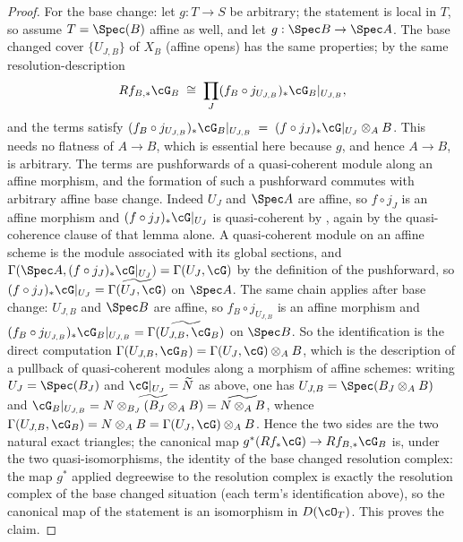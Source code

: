 \begin{proof}
For the base change: let $g:T\to S$ be arbitrary; the statement is
local in $T$, so assume $T=\Spec(B)$ affine as well, and let
$g:\Spec B\to\Spec A$.  The base changed cover
$\{U_{J,B}\}$ of $X_B$ (affine opens) has the same properties; by the
same resolution-description
\[
Rf_{B,*}\cG_B\;\cong\;\prod_{J}(f_B\circ j_{U_{J,B}})_*\cG_B|_{U_{J,B}},
\]
and the terms satisfy
$(f_B\circ j_{U_{J,B}})_*\cG_B|_{U_{J,B}}
\;=\;(f\circ j_J)_*\cG|_{U_J}\otimes_AB$.
This needs no flatness of $A\to B$, which is essential here because
$g$, and hence $A\to B$, is arbitrary.  The terms are pushforwards of a
quasi-coherent module along an affine morphism, and the formation of
such a pushforward commutes with arbitrary affine base change.  Indeed
$U_J$ and $\Spec A$ are affine, so $f\circ j_J$ is an affine morphism
and $(f\circ j_J)_*\cG|_{U_J}$ is quasi-coherent by
, again by the quasi-coherence clause
of that lemma alone.  A quasi-coherent module on an affine scheme is
the module associated with its global sections, and
$\Gamma(\Spec A,(f\circ j_J)_*\cG|_{U_J})=\Gamma(U_J,\cG)$ by the
definition of the pushforward, so
$(f\circ j_J)_*\cG|_{U_J}=\widetilde{\Gamma(U_J,\cG)}$ on $\Spec A$.
The same chain applies after base change: $U_{J,B}$ and $\Spec B$
are affine, so $f_B\circ j_{U_{J,B}}$ is an affine morphism and
$(f_B\circ j_{U_{J,B}})_*\cG_B|_{U_{J,B}}
=\widetilde{\Gamma(U_{J,B},\cG_B)}$ on $\Spec B$.  So the identification
is the direct computation
$\Gamma(U_{J,B},\cG_B)=\Gamma(U_J,\cG)\otimes_AB$, which is the
description of a pullback of quasi-coherent modules along a morphism of
affine schemes: writing $U_J=\Spec(B_J)$ and $\cG|_{U_J}=\widetilde N$
as above, one has $U_{J,B}=\Spec(B_J\otimes_AB)$ and
$\cG_B|_{U_{J,B}}=\widetilde{N\otimes_{B_J}(B_J\otimes_AB)}
=\widetilde{N\otimes_AB}$, whence
$\Gamma(U_{J,B},\cG_B)=N\otimes_AB=\Gamma(U_J,\cG)\otimes_AB$.
Hence the two sides
are the two natural exact triangles; the canonical map
$g^*(Rf_*\cG)\to Rf_{B,*}\cG_B$ is, under the two quasi-isomorphisms,
the identity of the base changed resolution complex: the map
$g^*$ applied degreewise to the resolution complex is exactly the
resolution complex of the base changed situation (each term's
identification above), so the canonical map of the statement is an
isomorphism in $D(\cO_T)$.  This proves the claim.
\end{proof}


